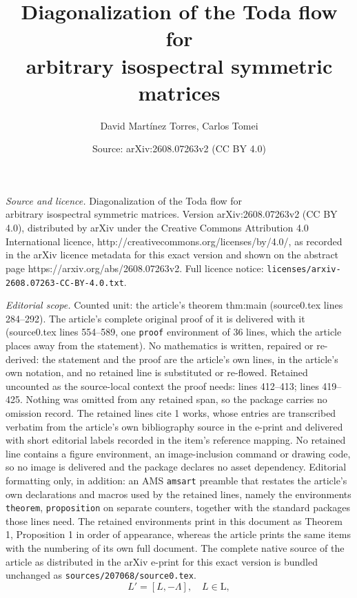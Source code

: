 \documentclass[10pt,a4paper]{amsart}
\title{Diagonalization of the Toda flow for \\ arbitrary isospectral symmetric matrices}
\author{David Mart\'inez Torres, Carlos Tomei}
\date{Source: arXiv:2608.07263v2 (CC BY 4.0)}
\renewcommand{\L}{\mathrm{L}}
\begin{document}
\maketitle

\noindent\emph{Source and licence.} Diagonalization of the Toda flow for \\ arbitrary isospectral symmetric matrices. Version arXiv:2608.07263v2 (CC BY 4.0), distributed by arXiv under the Creative Commons Attribution 4.0 International licence, http://creativecommons.org/licenses/by/4.0/, as recorded in the arXiv licence metadata for this exact version and shown on the abstract page https://arxiv.org/abs/2608.07263v2. Full licence notice: \texttt{licenses/arxiv-2608.07263-CC-BY-4.0.txt}.\par\smallskip

\noindent\textit{Editorial scope.} Counted unit: the article's theorem thm:main (source0.tex lines 284--292). The article's complete original proof of it is delivered with it (source0.tex lines 554--589, one \texttt{proof} environment of 36 lines, which the article places away from the statement). No mathematics is written, repaired or re-derived: the statement and the proof are the article's own lines, in the article's own notation, and no retained line is substituted or re-flowed.  Retained uncounted as the source-local context the proof needs: lines 412--413; lines 419--425.  Nothing was omitted from any retained span, so the package carries no omission record.  The retained lines cite 1 works, whose entries are transcribed verbatim from the article's own bibliography source in the e-print and delivered with short editorial labels recorded in the item's reference mapping.  No retained line contains a figure environment, an image-inclusion command or drawing code, so no image is delivered and the package declares no asset dependency.  Editorial formatting only, in addition: an AMS \texttt{amsart} preamble that restates the article's own declarations and macros used by the retained lines, namely the environments \texttt{theorem}, \texttt{proposition} on separate counters, together with the standard packages those lines need.  The retained environments print in this document as Theorem 1, Proposition 1 in order of appearance, whereas the article prints the same items with the numbering of its own full document.  The complete native source of the article as distributed in the arXiv e-print for this exact version is bundled unchanged as \texttt{sources/207068/source0.tex}.
\begin{equation}\label{eq:diagonal-linear}L'=[L,-\Lambda],\quad L\in \L,
\end{equation}
\end{document}
